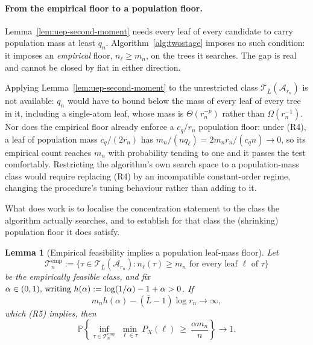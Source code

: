 \documentclass[11pt]{article}
\theoremstyle{plain}
\newtheorem{lemma}[theorem]{Lemma}
\theoremstyle{definition}
\theoremstyle{remark}
\newcommand{\PP}{\mathbb{P}}
\newcommand{\cA}{\mathcal{A}}
\newcommand{\cT}{\mathcal{T}}
\begin{document}
\paragraph{From the empirical floor to a population floor.}
Lemma~\ref{lem:uep-second-moment} needs every leaf of every candidate to carry
population mass at least \(q_n\). Algorithm~\ref{alg:twostage} imposes no such
condition: it imposes an \emph{empirical} floor, \(n_\ell\ge m_n\), on the
trees it searches. The gap is real and cannot be closed by fiat in either
direction.

Applying Lemma~\ref{lem:uep-second-moment} to the unrestricted class
\(\cT_{\bar L}(\cA_{r_n})\) is not available: \(q_n\) would have to bound
below the mass of every leaf of every tree in it, including a single-atom
leaf, whose mass is \(\Theta(r_n^{-p})\) rather than \(\Omega(r_n^{-1})\).
Nor does the empirical floor already enforce a \(c_q/r_n\) population floor:
under (R4), a leaf of population mass \(c_q/(2r_n)\) has
\(m_n/(n q_\ell)=2m_nr_n/(c_qn)\to0\), so its empirical count reaches \(m_n\)
with probability tending to one and it passes the test comfortably. Restricting
the algorithm's own search space to a population-mass class would require
replacing (R4) by an incompatible constant-order regime, changing the
procedure's tuning behaviour rather than adding to it.

What does work is to localise the concentration statement to the class the
algorithm actually searches, and to establish for that class the (shrinking)
population floor it does satisfy.

\begin{lemma}[Empirical feasibility implies a population leaf-mass floor]
\label{lem:empirical-feasible-mass}
Let
\[
  \cT^{\mathrm{emp}}_n
  :=
  \bigl\{\tau\in\cT_{\bar L}(\cA_{r_n}):
    n_\ell(\tau)\ge m_n\text{ for every leaf }\ell\text{ of }\tau\bigr\}
\]
be the empirically feasible class, and fix \(\alpha\in(0,1)$, writing
\(h(\alpha):=\log(1/\alpha)-1+\alpha>0\). If
\[
  m_nh(\alpha)-(\bar L-1)\log r_n\longrightarrow\infty,
\]
which (R5) implies, then
\[
  \PP\left\{
    \inf_{\tau\in\cT^{\mathrm{emp}}_n}\ \min_{\ell\in\tau}\ P_X(\ell)
    \ \ge\ \frac{\alpha m_n}{n}
  \right\}
  \longrightarrow1 .
\]
\end{lemma}
\end{document}
